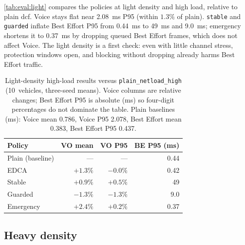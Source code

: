 \autoref{tab:eval:light} compares the policies at light density and high load, relative to plain \gls{dcf}.
Voice stays flat near 2.08~ms P95 (within $1.3\%$ of plain).
\texttt{stable} and \texttt{guarded} inflate Best Effort P95 from 0.44~ms to 49~ms and 9.0~ms; emergency shortens it to 0.37~ms by dropping queued Best Effort frames, which does not affect Voice.
The light density is a first check: even with little channel stress, protection windows open, and blocking without dropping already harms Best Effort traffic.

\begin{table}[htb]
	\ABNTEXfontereduzida
	\caption{\label{tab:eval:light}Light-density high-load results versus \texttt{plain\_netload\_high} (10~vehicles, three-seed means). Voice columns are relative changes; Best Effort P95 is absolute (ms) so four-digit percentages do not dominate the table. Plain baselines (ms): Voice mean 0.786, Voice P95 2.078, Best Effort mean 0.383, Best Effort P95 0.437.}
	\begin{center}
		\setlength{\tabcolsep}{5pt}
		\begin{tabular}{@{}lrrr@{}}
			\toprule
			\textbf{Policy} &
			\textbf{VO mean} &
			\textbf{VO P95} &
			\textbf{BE P95 (ms)} \\
			\midrule
			Plain (baseline) & --- & --- & 0.44 \\
			EDCA      & $+1.3\%$  & $-0.0\%$   & 0.42 \\
			Stable    & $+0.9\%$  & $+0.5\%$  & 49 \\
			Guarded   & $-1.3\%$  & $-1.3\%$  & 9.0 \\
			Emergency & $+2.4\%$ & $+0.2\%$ & 0.37 \\
			\bottomrule
		\end{tabular}
	\end{center}
\end{table}

\subsection{Heavy density}
\label{sec:eval:heavy:qos}

